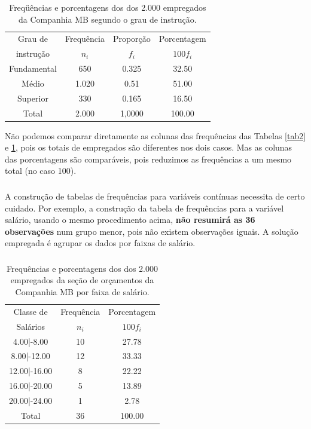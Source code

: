 \documentclass[14pt,aspectratio=1610]{beamer}
\begin{document}
\begin{frame}{}
\frametitle{}
\begin{block}{}
\justifying
\begin{table}[H]
\caption{Freqüências e porcentagens dos dos 2.000 empregados da Companhia MB segundo o grau de instrução.}
\label{tab3}
\begin{tabular}{c|c|c|c}
\hline
Grau de   &Frequência&Proporção&Porcentagem\\
instrução &$n_{i}$   &$f_{i}$  &$100f_{i}$ \\
\hline
Fundamental&650      &0.325    &32.50      \\
Médio      &1.020    &0.51     &51.00      \\
Superior   & 330     &0.165    &16.50      \\
\hline
Total      &2.000    &1,0000   &100.00     \\
\hline
\end{tabular}
\end{table}
Não podemos comparar diretamente as colunas das frequências das Tabelas \ref{tab2} e \ref{tab3}, pois os totais de empregados são diferentes nos dois casos. Mas 
as colunas das porcentagens são comparáveis, pois reduzimos as frequências a um mesmo total (no caso 100).
\end{block}
\end{frame}

\begin{frame}{}
\frametitle{}
\begin{block}{}
\justifying
A construção de tabelas de frequências para variáveis contínuas necessita de certo
cuidado. Por exemplo, a construção da tabela de frequências para a variável salário,
usando o mesmo procedimento acima, \textbf{não resumirá as 36 observações} num grupo
menor, pois não existem observações iguais. A solução empregada é agrupar os dados
por faixas de salário.
\end{block}
\end{frame}

\begin{frame}{}
\frametitle{}
\begin{block}{}
\justifying
\begin{table}[H]
\caption{Frequências e porcentagens dos dos 2.000 empregados da seção de orçamentos da Companhia MB por faixa de salário.}
\label{tab4}
\begin{tabular}{c|c|c}
\hline
Classe de   &Frequência&Porcentagem\\
Salários    &$n_{i}$   &$100f_{i}$ \\
\hline
4.00|-8.00  &10        &27.78      \\
8.00|-12.00 &12        &33.33      \\
12.00|-16.00&8         &22.22      \\
16.00|-20.00&5         &13.89      \\
20.00|-24.00&1         & 2.78      \\
\hline
Total       &36        &100.00     \\
\hline
\end{tabular}
\end{table}
\end{block}
\end{frame}
\end{document}
